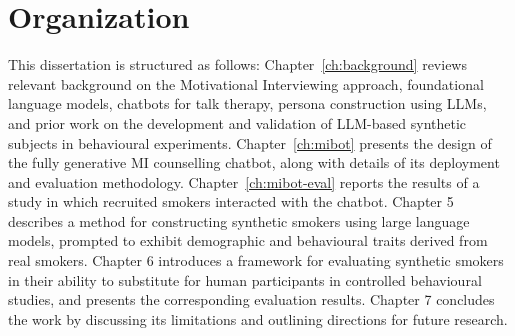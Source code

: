 \section{Organization}

This dissertation is structured as follows: Chapter~\ref{ch:background} reviews relevant background on the Motivational Interviewing approach, foundational language models, chatbots for talk therapy, persona construction using LLMs, and prior work on the development and validation of LLM-based synthetic subjects in behavioural experiments. Chapter~\ref{ch:mibot} presents the design of the fully generative MI counselling chatbot, along with details of its deployment and evaluation methodology. Chapter~\ref{ch:mibot-eval} reports the results of a study in which recruited smokers interacted with the chatbot. Chapter 5 describes a method for constructing synthetic smokers using large language models, prompted to exhibit demographic and behavioural traits derived from real smokers. Chapter 6 introduces a framework for evaluating synthetic smokers in their ability to substitute for human participants in controlled behavioural studies, and presents the corresponding evaluation results. Chapter 7 concludes the work by discussing its limitations and outlining directions for future research.
